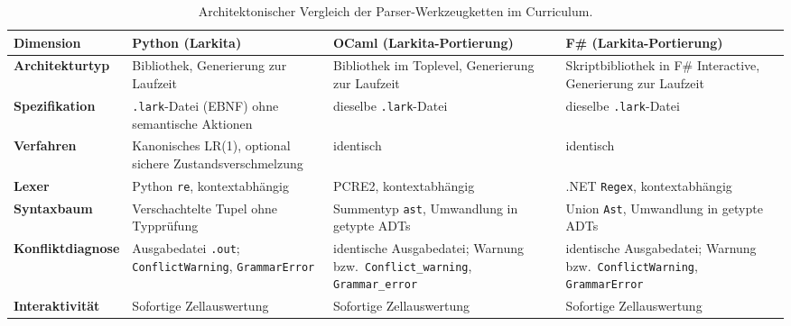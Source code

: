 \begin{table}[htbp]
  \centering
  \small
  \caption{Architektonischer Vergleich der Parser-Werkzeugketten im Curriculum.}
  \label{tab:toolchain_architectures}
  \begin{tabularx}{\textwidth}{lXXX}
    \toprule
    \textbf{Dimension} & \textbf{Python (Larkita)} & \textbf{OCaml (Larkita-Portierung)} & \textbf{F\# (Larkita-Portierung)} \\
    \midrule
    \textbf{Architekturtyp} & Bibliothek, Generierung zur Laufzeit & Bibliothek im Toplevel, Generierung zur Laufzeit & Skriptbibliothek in F\# Interactive, Generierung zur Laufzeit \\
    \addlinespace[3pt]
    \textbf{Spezifikation} & \texttt{.lark}-Datei (EBNF) ohne semantische Aktionen & dieselbe \texttt{.lark}-Datei & dieselbe \texttt{.lark}-Datei \\
    \addlinespace[3pt]
    \textbf{Verfahren} & Kanonisches LR(1), optional sichere Zustandsverschmelzung & identisch & identisch \\
    \addlinespace[3pt]
    \textbf{Lexer} & Python \texttt{re}, kontextabhängig & PCRE2, kontextabhängig & .NET \texttt{Regex}, kontextabhängig \\
    \addlinespace[3pt]
    \textbf{Syntaxbaum} & Verschachtelte Tupel ohne Typprüfung & Summentyp \texttt{ast}, Umwandlung in getypte ADTs & Union \texttt{Ast}, Umwandlung in getypte ADTs \\
    \addlinespace[3pt]
    \textbf{Konfliktdiagnose} & Ausgabedatei \texttt{.out}; \texttt{ConflictWarning}, \texttt{GrammarError} & identische Ausgabedatei; Warnung bzw.\ \texttt{Conflict\_warning}, \texttt{Grammar\_error} & identische Ausgabedatei; Warnung bzw.\ \texttt{ConflictWarning}, \texttt{GrammarError} \\
    \addlinespace[3pt]
    \textbf{Interaktivität} & Sofortige Zellauswertung & Sofortige Zellauswertung & Sofortige Zellauswertung \\
    \bottomrule
  \end{tabularx}
\end{table}

